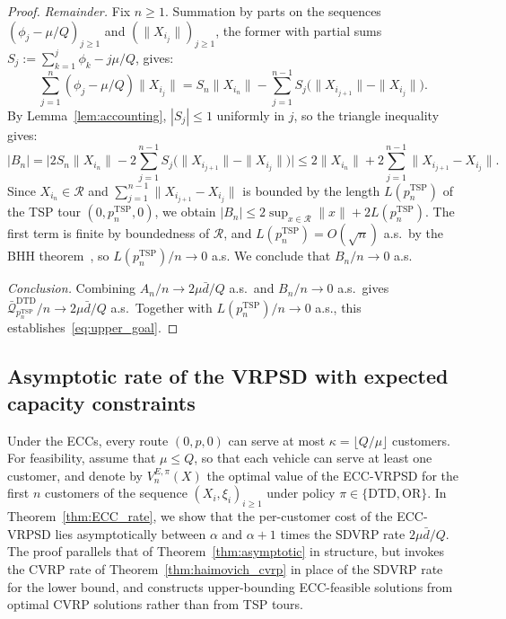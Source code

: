 \documentclass{article}
\begin{document}
{\begin{proof}
\emph{Remainder.} Fix $n \geq 1$. Summation by parts on the sequences $(\phi_j - \mu/Q)_{j \geq 1}$ 
and $(\|X_{i_j}\|)_{j \geq 1}$, the former with partial sums $S_j := \sum_{k=1}^j \phi_k - j\mu/Q$, gives:
\[
    \sum_{j=1}^n (\phi_j - \mu/Q) \|X_{i_j}\| 
    = S_n \|X_{i_n}\| - \sum_{j=1}^{n-1} S_j \bigl(\|X_{i_{j+1}}\| - \|X_{i_j}\|\bigr).
\]
By Lemma~\ref{lem:accounting}, $|S_j| \leq 1$ uniformly in $j$, so the triangle inequality gives:
\[
    |B_n| = \Big| 2 S_n \|X_{i_n}\| - 2 \sum_{j=1}^{n-1} S_j \bigl(\|X_{i_{j+1}}\| - \|X_{i_j}\|\bigr) \Big| \leq 2\|X_{i_n}\| + 2\sum_{j=1}^{n-1} \|X_{i_{j+1}} - X_{i_j}\|.
\]
Since $X_{i_n} \in \mathcal{R}$ and $\sum_{j=1}^{n-1} \|X_{i_{j+1}} - X_{i_j}\|$ is bounded by the length $L(p^{\text{TSP}}_n)$ of the TSP tour $(0, p^{\text{TSP}}_n, 0)$, we obtain $|B_n| \leq 2\sup_{x \in \mathcal{R}}\|x\| + 2 L(p^{\text{TSP}}_n)$. The first term is finite by boundedness of $\mathcal{R}$, and $L(p^{\text{TSP}}_n) = O(\sqrt{n})$ a.s.\ by the BHH theorem~\cite{beardwood1959shortest}, so $L(p^{\text{TSP}}_n)/n \to 0$ a.s. We conclude that $B_n/n \to 0$ a.s.

\emph{Conclusion.} Combining $A_n/n \to 2\mu\bar d/Q$ a.s.\ and $B_n/n \to 0$ a.s.\ gives $\bar{\mathcal{Q}}^{\text{DTD}}_{p^{\text{TSP}}_n}/n \to 2\mu\bar d/Q$ a.s.\ Together with $L(p^{\text{TSP}}_n)/n \to 0$ a.s., this establishes~\eqref{eq:upper_goal}.
\end{proof}

\subsection{Asymptotic rate of the VRPSD with expected capacity constraints}\label{sec:asymptotics:ECC}

Under the ECCs, every route $(0,p,0)$ can serve at most $\kappa = \lfloor Q/\mu \rfloor$ customers. For feasibility, assume that $\mu \leq Q$, so that each vehicle can serve at least one customer, and denote by $V^{E, \pi}_n(X)$ the optimal value of the ECC-VRPSD for the first $n$ customers of the sequence $(X_i, \xi_i)_{i \geq 1}$ under policy $\pi \in \{\text{DTD}, \text{OR}\}$. In Theorem~\ref{thm:ECC_rate}, we show that the per-customer cost of the ECC-VRPSD lies asymptotically between $\alpha$ and $\alpha + 1$ times the SDVRP rate $2\mu\bar{d}/Q$. The proof parallels that of Theorem~\ref{thm:asymptotic} in structure, but invokes the CVRP rate of Theorem~\ref{thm:haimovich_cvrp} in place of the SDVRP rate for the lower bound, and constructs upper-bounding ECC-feasible solutions from optimal CVRP solutions rather than from TSP tours.

}
\end{document}
